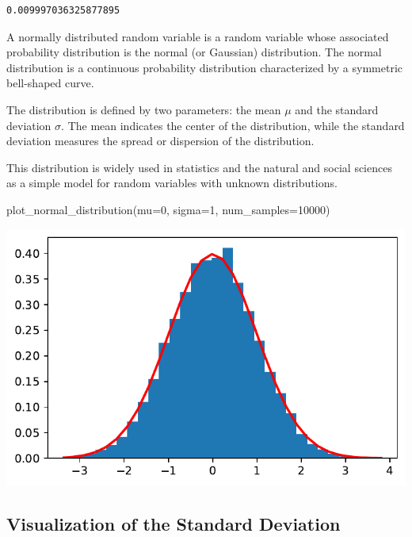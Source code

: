 \documentclass[
  letterpaper,
  DIV=11,
  numbers=noendperiod]{scrreprt}
\newenvironment{Shaded}{\begin{snugshade}}{\end{snugshade}}
\newcommand{\DecValTok}[1]{\textcolor[rgb]{0.68,0.00,0.00}{#1}}
\newcommand{\NormalTok}[1]{\textcolor[rgb]{0.00,0.23,0.31}{#1}}
\newcommand{\OperatorTok}[1]{\textcolor[rgb]{0.37,0.37,0.37}{#1}}
\begin{document}
\begin{verbatim}
0.009997036325877895
\end{verbatim}

A normally distributed random variable is a random variable whose
associated probability distribution is the normal (or Gaussian)
distribution. The normal distribution is a continuous probability
distribution characterized by a symmetric bell-shaped curve.

The distribution is defined by two parameters: the mean \(\mu\) and the
standard deviation \(\sigma\). The mean indicates the center of the
distribution, while the standard deviation measures the spread or
dispersion of the distribution.

This distribution is widely used in statistics and the natural and
social sciences as a simple model for random variables with unknown
distributions.

\begin{Shaded}
\begin{Highlighting}[]
\NormalTok{plot\_normal\_distribution(mu}\OperatorTok{=}\DecValTok{0}\NormalTok{, sigma}\OperatorTok{=}\DecValTok{1}\NormalTok{, num\_samples}\OperatorTok{=}\DecValTok{10000}\NormalTok{)}
\end{Highlighting}
\end{Shaded}

\includegraphics{006_num_gp_files/figure-pdf/cell-20-output-1.pdf}

\subsection{Visualization of the Standard
Deviation}\label{visualization-of-the-standard-deviation}
\end{document}
